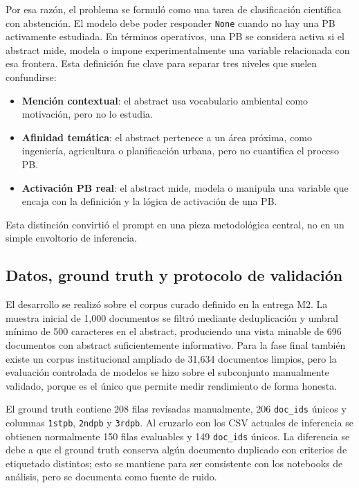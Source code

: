 Por esa razón, el problema se formuló como una tarea de clasificación científica con abstención. El modelo debe poder responder \texttt{None} cuando no hay una PB activamente estudiada. En términos operativos, una PB se considera activa si el abstract mide, modela o impone experimentalmente una variable relacionada con esa frontera. Esta definición fue clave para separar tres niveles que suelen confundirse:

\begin{itemize}
\item \textbf{Mención contextual}: el abstract usa vocabulario ambiental como motivación, pero no lo estudia.
\item \textbf{Afinidad temática}: el abstract pertenece a un área próxima, como ingeniería, agricultura o planificación urbana, pero no cuantifica el proceso PB.
\item \textbf{Activación PB real}: el abstract mide, modela o manipula una variable que encaja con la definición y la lógica de activación de una PB.
\end{itemize}

Esta distinción convirtió el prompt en una pieza metodológica central, no en un simple envoltorio de inferencia.

\subsection{Datos, ground truth y protocolo de validación}

El desarrollo se realizó sobre el corpus curado definido en la entrega M2. La muestra inicial de 1,000 documentos se filtró mediante deduplicación y umbral mínimo de 500 caracteres en el abstract, produciendo una vista minable de 696 documentos con abstract suficientemente informativo. Para la fase final también existe un corpus institucional ampliado de 31,634 documentos limpios, pero la evaluación controlada de modelos se hizo sobre el subconjunto manualmente validado, porque es el único que permite medir rendimiento de forma honesta.

El ground truth contiene 208 filas revisadas manualmente, 206 \texttt{doc\_ids} únicos y columnas \texttt{1stpb}, \texttt{2ndpb} y \texttt{3rdpb}. Al cruzarlo con los CSV actuales de inferencia se obtienen normalmente 150 filas evaluables y 149 \texttt{doc\_ids} únicos. La diferencia se debe a que el ground truth conserva algún documento duplicado con criterios de etiquetado distintos; esto se mantiene para ser consistente con los notebooks de análisis, pero se documenta como fuente de ruido.

